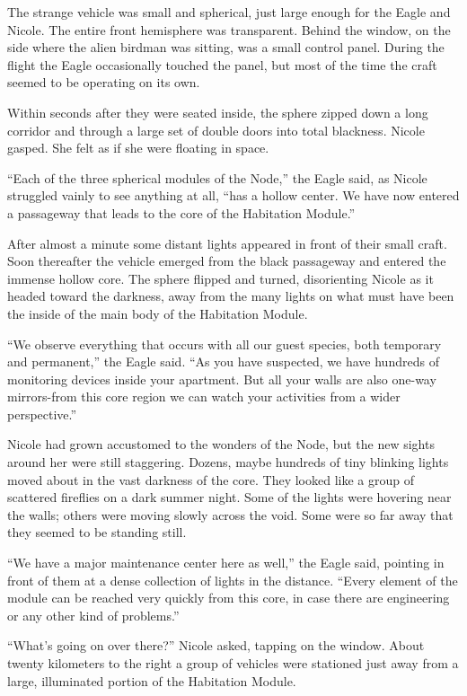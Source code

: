 \documentclass[]{article}
\begin{document}
{The strange vehicle was small and spherical, just large enough for the Eagle and Nicole.  The entire front hemisphere was transparent.  Behind the window, on the side where the alien birdman was sitting, was a small control panel.  During the flight the Eagle occasionally touched the panel, but most of the time the craft seemed to be operating on its own.

Within seconds after they were seated inside, the sphere zipped down a long corridor and through a large set of double doors into total blackness.  Nicole gasped.  She felt as if she were floating in space.

“Each of the three spherical modules of the Node,” the Eagle said, as Nicole struggled vainly to see anything at all, “has a hollow center.  We have now entered a passageway that leads to the core of the Habitation Module.”

After almost a minute some distant lights appeared in front of their small craft.  Soon thereafter the vehicle emerged from the black passageway and entered the immense hollow core.  The sphere flipped and turned, disorienting Nicole as it headed toward the darkness, away from the many lights on what must have been the inside of the main body of the Habitation Module.

“We observe everything that occurs with all our guest species, both temporary and permanent,” the Eagle said.  “As you have suspected, we have hundreds of monitoring devices inside your apartment.  But all your walls are also one-way mirrors-from this core region we can watch your activities from a wider perspective.”

Nicole had grown accustomed to the wonders of the Node, but the new sights around her were still staggering.  Dozens, maybe hundreds of tiny blinking lights moved about in the vast darkness of the core.  They looked like a group of scattered fireflies on a dark summer night.  Some of the lights were hovering near the walls; others were moving slowly across the void.  Some were so far away that they seemed to be standing still.

“We have a major maintenance center here as well,” the Eagle said, pointing in front of them at a dense collection of lights in the distance.  “Every element of the module can be reached very quickly from this core, in case there are engineering or any other kind of problems.”

“What’s going on over there?” Nicole asked, tapping on the window.  About twenty kilometers to the right a group of vehicles were stationed just away from a large, illuminated portion of the Habitation Module.

}
\end{document}
